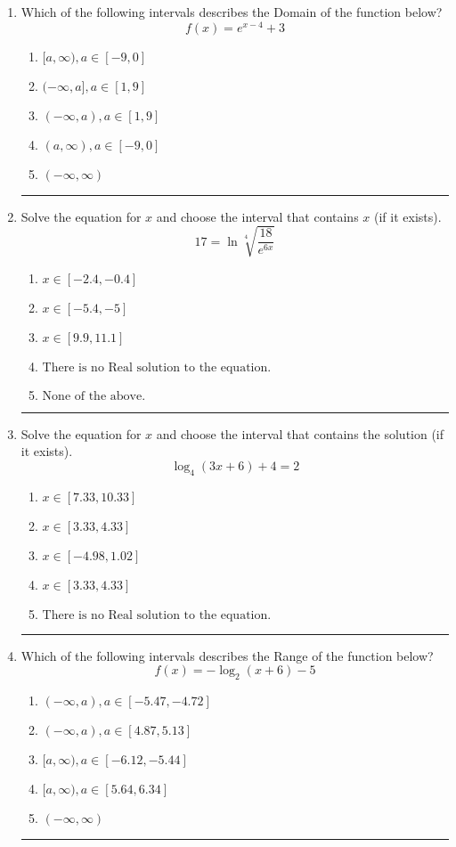 \documentclass[14pt]{extbook}
\newcommand{\litem}[1]{\item#1\hspace*{-1cm}\rule{\textwidth}{0.4pt}}
\begin{document}
\begin{enumerate}
{\begin{enumerate}[label=\Alph*.]
\end{enumerate} }
\litem{
Which of the following intervals describes the Domain of the function below?\[ f(x) = e^{x-4}+3 \]\begin{enumerate}[label=\Alph*.]
\item \( [a, \infty), a \in [-9, 0] \)
\item \( (-\infty, a], a \in [1, 9] \)
\item \( (-\infty, a), a \in [1, 9] \)
\item \( (a, \infty), a \in [-9, 0] \)
\item \( (-\infty, \infty) \)

\end{enumerate} }
\litem{
 Solve the equation for $x$ and choose the interval that contains $x$ (if it exists).\[  17 = \ln{\sqrt[4]{\frac{18}{e^{6x}}}} \]\begin{enumerate}[label=\Alph*.]
\item \( x \in [-2.4, -0.4] \)
\item \( x \in [-5.4, -5] \)
\item \( x \in [9.9, 11.1] \)
\item \( \text{There is no Real solution to the equation.} \)
\item \( \text{None of the above.} \)

\end{enumerate} }
\litem{
Solve the equation for $x$ and choose the interval that contains the solution (if it exists).\[ \log_{4}{(3x+6)}+4 = 2 \]\begin{enumerate}[label=\Alph*.]
\item \( x \in [7.33, 10.33] \)
\item \( x \in [3.33, 4.33] \)
\item \( x \in [-4.98, 1.02] \)
\item \( x \in [3.33, 4.33] \)
\item \( \text{There is no Real solution to the equation.} \)

\end{enumerate} }
\litem{
Which of the following intervals describes the Range of the function below?\[ f(x) = -\log_2{(x+6)}-5 \]\begin{enumerate}[label=\Alph*.]
\item \( (-\infty, a), a \in [-5.47, -4.72] \)
\item \( (-\infty, a), a \in [4.87, 5.13] \)
\item \( [a, \infty), a \in [-6.12, -5.44] \)
\item \( [a, \infty), a \in [5.64, 6.34] \)
\item \( (-\infty, \infty) \)


\end{enumerate}}
\end{enumerate}
\end{document}
